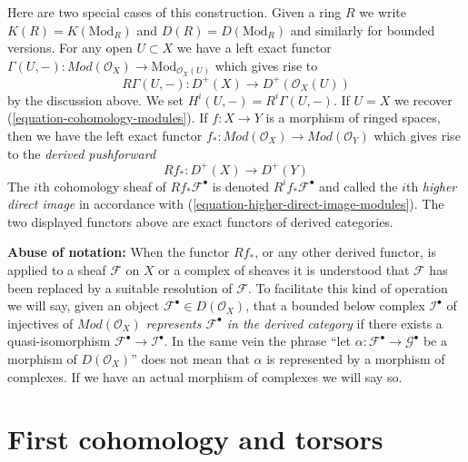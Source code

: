 \medskip\noindent
Here are two special cases of this construction.
Given a ring $R$ we write $K(R) = K(\text{Mod}_R)$ and
$D(R) = D(\text{Mod}_R)$ and similarly for bounded versions.
For any open $U \subset X$ we have a left exact functor
$
\Gamma(U, -) :
\textit{Mod}(\mathcal{O}_X)
\longrightarrow
\text{Mod}_{\mathcal{O}_X(U)}
$
which gives rise to
\begin{equation}
\label{equation-total-derived-cohomology}
R\Gamma(U, -) :
D^{+}(X)
\longrightarrow
D^{+}(\mathcal{O}_X(U))
\end{equation}
by the discussion above. We set $H^i(U, -) = R^i\Gamma(U, -)$.
If $U = X$ we recover (\ref{equation-cohomology-modules}).
If $f : X \to Y$ is a morphism of ringed spaces, then we have
the left exact functor
$
f_* :
\textit{Mod}(\mathcal{O}_X)
\longrightarrow
\textit{Mod}(\mathcal{O}_Y)
$
which gives rise to the {\it derived pushforward}
\begin{equation}
\label{equation-total-derived-direct-image}
Rf_* :
D^{+}(X)
\longrightarrow
D^{+}(Y)
\end{equation}
The $i$th cohomology sheaf of $Rf_*\mathcal{F}^\bullet$ is denoted
$R^if_*\mathcal{F}^\bullet$ and called the $i$th {\it higher direct image}
in accordance with (\ref{equation-higher-direct-image-modules}).
The two displayed functors above are exact functors
of derived categories.

\medskip\noindent
{\bf Abuse of notation:} When the functor $Rf_*$, or any other
derived functor, is applied to a sheaf $\mathcal{F}$ on $X$ or a complex
of sheaves it is understood that $\mathcal{F}$ has been replaced by a
suitable resolution of $\mathcal{F}$. To facilitate this kind of
operation we will say, given an object
$\mathcal{F}^\bullet \in D(\mathcal{O}_X)$,
that a bounded below complex $\mathcal{I}^\bullet$ of injectives of
$\textit{Mod}(\mathcal{O}_X)$
{\it represents $\mathcal{F}^\bullet$ in the derived category}
if there exists a quasi-isomorphism
$\mathcal{F}^\bullet \to \mathcal{I}^\bullet$. In the same vein the phrase
``let $\alpha : \mathcal{F}^\bullet \to \mathcal{G}^\bullet$ be
a morphism of $D(\mathcal{O}_X)$''
does not mean that $\alpha$ is represented by a
morphism of complexes. If we have an actual morphism of complexes we will
say so.









\section{First cohomology and torsors}
\label{section-h1-torsors}

